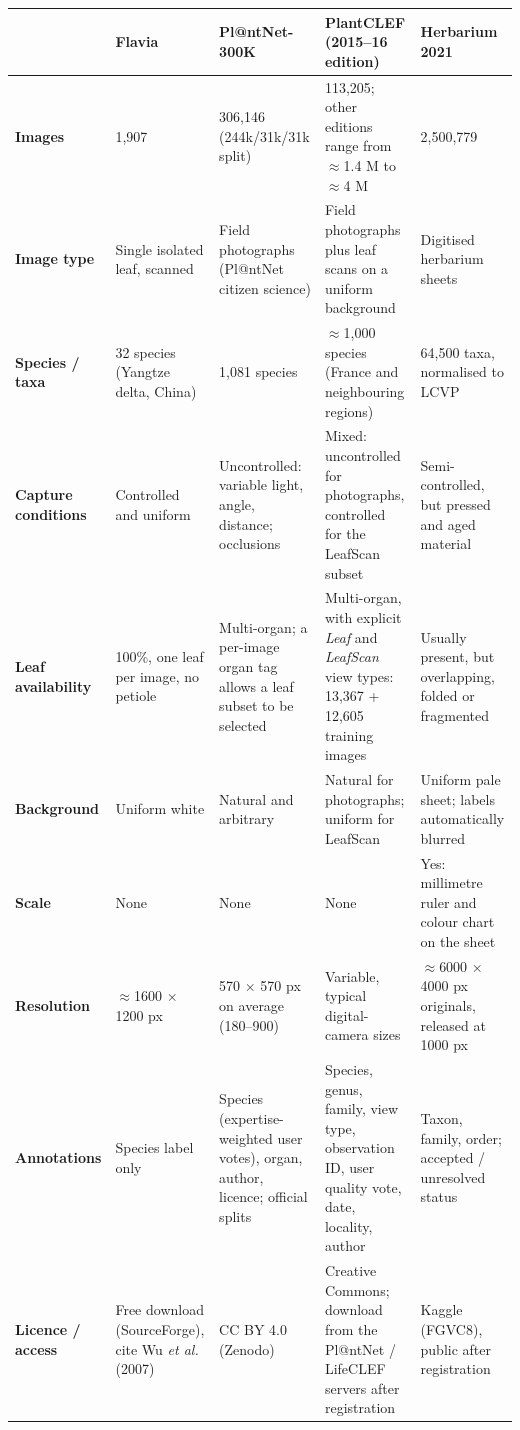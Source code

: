 \documentclass[11pt,a4paper]{article}
\begin{document}
\begin{tabularx}{\linewidth}{L{2.05cm} Y Y Y Y}
\toprule
 & \textbf{Flavia} & \textbf{Pl@ntNet-300K} &
\textbf{PlantCLEF (2015--16 edition)} & \textbf{Herbarium 2021} \\
\midrule

\textbf{Images} &
1,907 &
306,146 (244k/31k/31k split) &
113,205; other editions range from $\approx$1.4 M to $\approx$4 M &
2,500,779 \\
\addlinespace[3pt]

\textbf{Image type} &
Single isolated leaf, scanned &
Field photographs (Pl@ntNet citizen science) &
Field photographs plus leaf scans on a uniform background &
Digitised herbarium sheets \\
\addlinespace[3pt]

\textbf{Species / taxa} &
32 species (Yangtze delta, China) &
1,081 species &
$\approx$1,000 species (France and neighbouring regions) &
64,500 taxa, normalised to LCVP \\
\addlinespace[3pt]

\textbf{Capture conditions} &
Controlled and uniform &
Uncontrolled: variable light, angle, distance; occlusions &
Mixed: uncontrolled for photographs, controlled for the LeafScan subset &
Semi-controlled, but pressed and aged material \\
\addlinespace[3pt]

\textbf{Leaf availability} &
100\%, one leaf per image, no petiole &
Multi-organ; a per-image organ tag allows a leaf subset to be selected &
Multi-organ, with explicit \textit{Leaf} and \textit{LeafScan} view types:
13,367 + 12,605 training images &
Usually present, but overlapping, folded or fragmented \\
\addlinespace[3pt]

\textbf{Background} &
Uniform white &
Natural and arbitrary &
Natural for photographs; uniform for LeafScan &
Uniform pale sheet; labels automatically blurred \\
\addlinespace[3pt]

\textbf{Scale} &
None &
None &
None &
Yes: millimetre ruler and colour chart on the sheet \\
\addlinespace[3pt]

\textbf{Resolution} &
$\approx$1600 $\times$ 1200 px &
570 $\times$ 570 px on average (180--900) &
Variable, typical digital-camera sizes &
$\approx$6000 $\times$ 4000 px originals, released at 1000 px \\
\addlinespace[3pt]

\textbf{Annotations} &
Species label only &
Species (expertise-weighted user votes), organ, author, licence; official
splits &
Species, genus, family, view type, observation ID, user quality vote, date,
locality, author &
Taxon, family, order; accepted / unresolved status \\
\addlinespace[3pt]

\textbf{Licence / access} &
Free download (SourceForge), cite Wu \textit{et al.} (2007) &
CC BY 4.0 (Zenodo) &
Creative Commons; download from the Pl@ntNet / LifeCLEF servers after
registration &
Kaggle (FGVC8), public after registration \\

\bottomrule
\end{tabularx}
\end{document}
